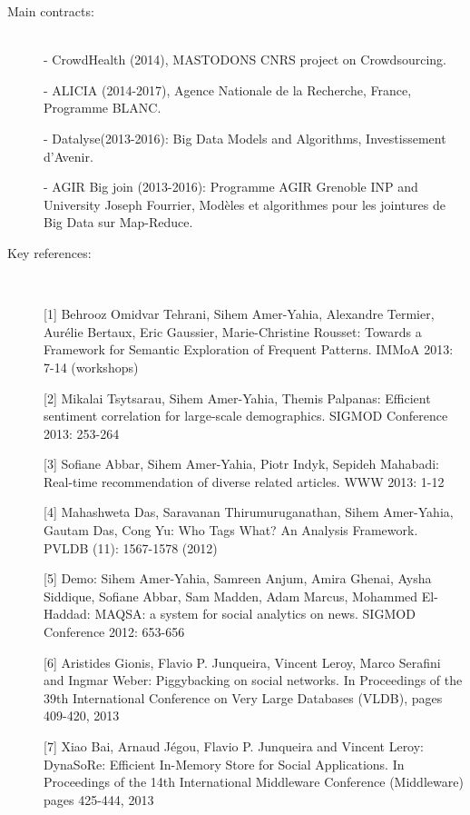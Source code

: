 \begin{description}

\item[Main contracts:]  \ \\
- CrowdHealth (2014), MASTODONS CNRS project on Crowdsourcing. 

- ALICIA (2014-2017), Agence Nationale de la Recherche, France, Programme BLANC. 

- Datalyse(2013-2016): Big Data Models and Algorithms, Investissement d'Avenir.


- AGIR Big join (2013-2016): Programme AGIR Grenoble INP and  University Joseph Fourrier,  Mod{\`e}les et algorithmes pour les jointures de Big Data sur Map-Reduce. 
  
\item[Key references:]
~%

[1]   Behrooz Omidvar Tehrani, Sihem Amer-Yahia, Alexandre Termier, Aur{\'e}lie Bertaux, Eric Gaussier, Marie-Christine Rousset: Towards a Framework for Semantic Exploration of Frequent Patterns. IMMoA 2013: 7-14 (workshops) 

[2]  Mikalai Tsytsarau, Sihem Amer-Yahia, Themis Palpanas: Efficient sentiment correlation for large-scale demographics. SIGMOD Conference 2013: 253-264

[3]  Sofiane Abbar, Sihem Amer-Yahia, Piotr Indyk, Sepideh Mahabadi: Real-time recommendation of diverse related articles. WWW 2013: 1-12

[4]  Mahashweta Das, Saravanan Thirumuruganathan, Sihem Amer-Yahia, Gautam Das, Cong Yu: Who Tags What? An Analysis Framework. PVLDB (11): 1567-1578 (2012)

[5]  Demo: Sihem Amer-Yahia, Samreen Anjum, Amira Ghenai, Aysha Siddique, Sofiane Abbar, Sam Madden, Adam Marcus, Mohammed El-Haddad: MAQSA: a system for social analytics on news. SIGMOD Conference 2012: 653-656

[6] Aristides Gionis, Flavio P. Junqueira, Vincent Leroy, Marco Serafini and Ingmar Weber: Piggybacking on social networks. In Proceedings of the 39th International Conference on Very Large Databases (VLDB), pages 409-420, 2013

[7]  Xiao Bai, Arnaud J{\'e}gou, Flavio P. Junqueira and Vincent Leroy:  DynaSoRe: Efficient In-Memory Store for Social Applications. In Proceedings of the 14th International Middleware Conference (Middleware)  pages 425-444, 2013

\end{description}

